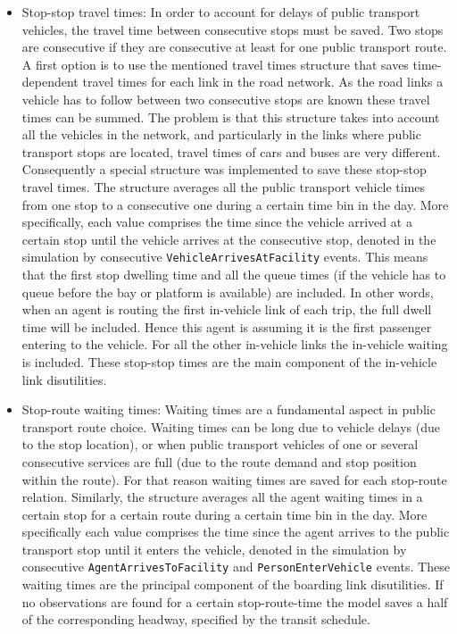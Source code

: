\begin{itemize}\styleItemize
\item Stop-stop travel times: In order to account for delays of public transport vehicles, the travel time between consecutive stops must be saved. Two stops are consecutive if they are consecutive at least for one public transport route. A first option is to use the mentioned travel times structure that saves time-dependent travel times for each link in the road network. As the road links a vehicle has to follow between two consecutive stops are known these travel times can be summed. The problem is that this structure takes into account all the vehicles in the network, and particularly in the links where public transport stops are located, travel times of cars and buses are very different. Consequently a special structure was implemented to save these stop-stop travel times. The structure averages all the public transport vehicle times from one stop to a consecutive one during a certain time bin in the day. More specifically, each value comprises the time since the vehicle arrived at a certain stop until the vehicle arrives at the consecutive stop, denoted in the simulation by consecutive \lstinline|VehicleArrivesAtFacility| events. This means that the first stop dwelling time and all the queue times (if the vehicle has to queue before the bay or platform is available) are included. In other words, when an agent is routing the first in-vehicle link of each trip, the full dwell time will be included. Hence this agent is assuming it is the first passenger entering to the vehicle. For all the other in-vehicle links the in-vehicle waiting is included. These stop-stop times are the main component of the in-vehicle link disutilities.
%
\item Stop-route waiting times: Waiting times are a fundamental aspect in public transport route choice. Waiting times can be long due to vehicle delays (\ie due to the stop location), or when public transport vehicles of one or several consecutive services are full (\ie due to the route demand and stop position within the route). For that reason waiting times are saved for each stop-route relation. Similarly, the structure averages all the agent waiting times in a certain stop for a certain route during a certain time bin in the day. More specifically each value comprises the time since the agent arrives to the public transport stop until it enters the vehicle, denoted in the simulation by consecutive \lstinline|AgentArrivesToFacility| and \lstinline|PersonEnterVehicle| \glspl{event}. These waiting times are the principal component of the boarding link disutilities. If no observations are found for a certain stop-route-time the model saves a half of the corresponding headway, specified by the transit schedule.

\end{itemize}
